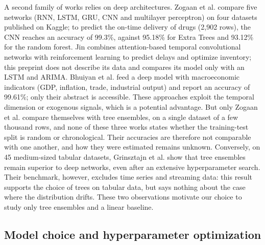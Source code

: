 \documentclass[11pt,a4paper]{article}
\theoremstyle{definition}
\begin{document}
A second family of works relies on deep architectures. Zogaan et al. \cite{zogaan2025leveraging} compare five networks (RNN, LSTM, GRU, CNN and multilayer perceptron) on four datasets published on Kaggle; to predict the on-time delivery of drugs (2{,}902 rows), the CNN reaches an accuracy of 99.3\%, against 95.18\% for Extra Trees and 93.12\% for the random forest. Jin \cite{jin2025attention} combines attention-based temporal convolutional networks with reinforcement learning to predict delays and optimize inventory; this preprint does not describe its data and compares its model only with an LSTM and ARIMA. Bhuiyan et al. \cite{bhuiyan2026deep} feed a deep model with macroeconomic indicators (GDP, inflation, trade, industrial output) and report an accuracy of 99.61\%; only their abstract is accessible. These approaches exploit the temporal dimension or exogenous signals, which is a potential advantage. But only Zogaan et al. compare themselves with tree ensembles, on a single dataset of a few thousand rows, and none of these three works states whether the training-test split is random or chronological. Their accuracies are therefore not comparable with one another, and how they were estimated remains unknown. Conversely, on 45 medium-sized tabular datasets, Grinsztajn et al. \cite{grinsztajn2022tree} show that tree ensembles remain superior to deep networks, even after an extensive hyperparameter search. Their benchmark, however, excludes time series and streaming data: this result supports the choice of trees on tabular data, but says nothing about the case where the distribution drifts. These two observations motivate our choice to study only tree ensembles and a linear baseline.

\subsection{Model choice and hyperparameter optimization}
\label{sec:rw-hpo}
\end{document}
